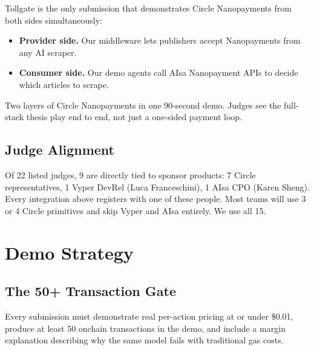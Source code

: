\documentclass[11pt,a4paper]{article}
\newcommand{\iconNetwork}{\textcolor{tollgatearc}{\faNetworkWired}}
\newcommand{\iconBolt}{\textcolor{tollgatepink}{\faBolt}}
\begin{document}
\begin{archbox}[title={\iconNetwork~ Both provider and consumer of Nanopayments}]
Tollgate is the only submission that demonstrates Circle Nanopayments from both sides simultaneously:

\begin{itemize}[leftmargin=*]
  \item \textbf{Provider side.} Our middleware lets publishers accept Nanopayments from any AI scraper.
  \item \textbf{Consumer side.} Our demo agents call AIsa Nanopayment APIs to decide which articles to scrape.
\end{itemize}

Two layers of Circle Nanopayments in one 90-second demo. Judges see the full-stack thesis play end to end, not just a one-sided payment loop.
\end{archbox}

\subsection{Judge Alignment}

Of 22 listed judges, 9 are directly tied to sponsor products: 7 Circle representatives, 1 Vyper DevRel (Luca Franceschini), 1 AIsa CPO (Karen Sheng). Every integration above registers with one of these people. Most teams will use 3 or 4 Circle primitives and skip Vyper and AIsa entirely. We use all 15.

\newpage

\section{Demo Strategy}

\subsection{The 50+ Transaction Gate}

\begin{warnbox}[title={\iconBolt~ Hard rule from the hackathon brief}]
Every submission must demonstrate real per-action pricing at or under \$0.01, produce at least 50 onchain transactions in the demo, and include a margin explanation describing why the same model fails with traditional gas costs.
\end{warnbox}
\end{document}
